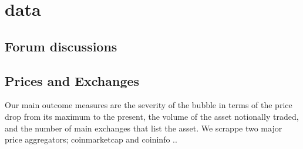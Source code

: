 \section{data}

\subsection{Forum discussions}



\subsection{Prices and Exchanges}

Our main outcome measures are the severity of the bubble in terms of the price drop from its maximum to the present, the volume of the asset notionally traded, and the number of main exchanges that list the asset.
We scrappe two major price aggregators; coinmarketcap and coininfo ..
